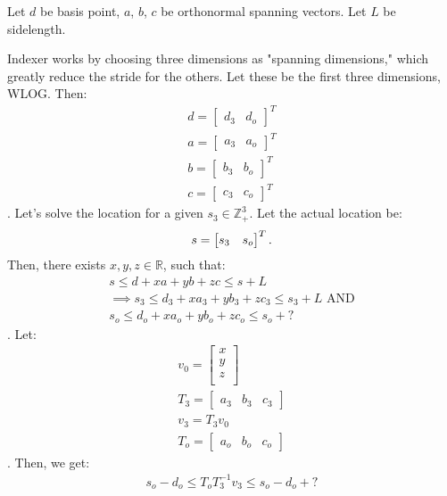 \documentclass[a4paper]{article}
\begin{document}
  Let $d$ be basis point, $a$, $b$, $c$ be orthonormal spanning vectors. Let $L$ be sidelength.
  
  Indexer works by choosing three dimensions as "spanning dimensions," which
  greatly reduce the stride for the others. Let these be the first three dimensions, WLOG. Then:
  \begin{gather*}
    d=\begin{bmatrix}d_3&d_{o}\end{bmatrix}^{T}\\
    a=\begin{bmatrix}a_3&a_{o}\end{bmatrix}^{T}\\
    b=\begin{bmatrix}b_3&b_{o}\end{bmatrix}^{T}\\
    c=\begin{bmatrix}c_3&c_{o}\end{bmatrix}^{T}
  \end{gather*}
. Let's solve the location for a given $s_3\in \mathbb{Z}_{+}^{3}$. Let the actual location be:
  \[
    s=\begin{bmatrix}s_3&s_{o}\end{bmatrix}^{T}\\
  .\] Then, there exists $x,y,z\in\mathbb{R}$, such that:
  \begin{gather*}
    s\le d+xa+yb+zc \le s+L\\
    \implies s_3\le d_3+xa_3+yb_3+zc_3\le s_3+L\text{ AND}\\
    s_{o}\le d_{o}+xa_{o}+yb_{o}+zc_{o}\le s_{o}+\mathbf{?}
  \end{gather*}
  . Let:
  \begin{gather*}
    v_0=\begin{bmatrix}
      x\\
      y\\
      z\\
    \end{bmatrix}\\
    T_3=\begin{bmatrix}
      a_3&b_3&c_3
    \end{bmatrix}\\
    v_3=T_3v_0\\
    T_{o}=\begin{bmatrix}
      a_{o}&b_{o}&c_{o}
    \end{bmatrix}
  \end{gather*}
  . Then, we get:
  \begin{gather*}
    s_{o}-d_{o}\le T_{o}T_3^{-1}v_3\le s_{o}-d_{o}+\mathbf{?}
  \end{gather*}
\end{document}
